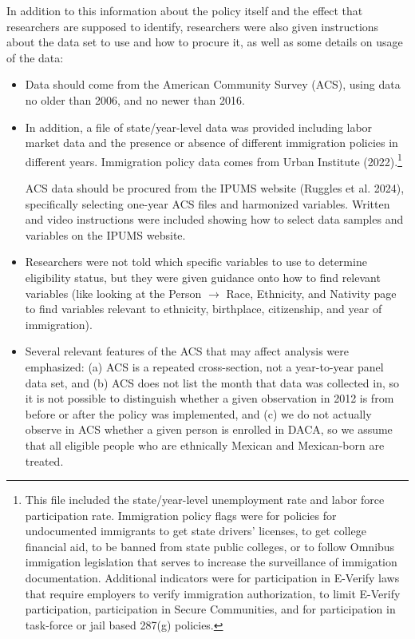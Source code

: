 \documentclass[
  letterpaper,
  DIV=11,
  numbers=noendperiod]{scrartcl}
\begin{document}
In addition to this information about the policy itself and the effect
that researchers are supposed to identify, researchers were also given
instructions about the data set to use and how to procure it, as well as
some details on usage of the data:

\begin{itemize}
\item
  Data should come from the American Community Survey (ACS), using data
  no older than 2006, and no newer than 2016.
\item
  In addition, a file of state/year-level data was provided including
  labor market data and the presence or absence of different immigration
  policies in different years. Immigration policy data comes from Urban
  Institute (2022).\footnote{This file included the state/year-level
    unemployment rate and labor force participation rate. Immigration
    policy flags were for policies for undocumented immigrants to get
    state drivers' licenses, to get college financial aid, to be banned
    from state public colleges, or to follow Omnibus immigation
    legislation that serves to increase the surveillance of immigation
    documentation. Additional indicators were for participation in
    E-Verify laws that require employers to verify immigration
    authorization, to limit E-Verify participation, participation in
    Secure Communities, and for participation in task-force or jail
    based 287(g) policies.}

  ACS data should be procured from the IPUMS website (Ruggles et al.
  2024), specifically selecting one-year ACS files and harmonized
  variables. Written and video instructions were included showing how to
  select data samples and variables on the IPUMS website.
\item
  Researchers were not told which specific variables to use to determine
  eligibility status, but they were given guidance onto how to find
  relevant variables (like looking at the Person \(\rightarrow\) Race,
  Ethnicity, and Nativity page to find variables relevant to ethnicity,
  birthplace, citizenship, and year of immigration).
\item
  Several relevant features of the ACS that may affect analysis were
  emphasized: (a) ACS is a repeated cross-section, not a year-to-year
  panel data set, and (b) ACS does not list the month that data was
  collected in, so it is not possible to distinguish whether a given
  observation in 2012 is from before or after the policy was
  implemented, and (c) we do not actually observe in ACS whether a given
  person is enrolled in DACA, so we assume that all eligible people who
  are ethnically Mexican and Mexican-born are treated.
\end{itemize}
\end{document}
